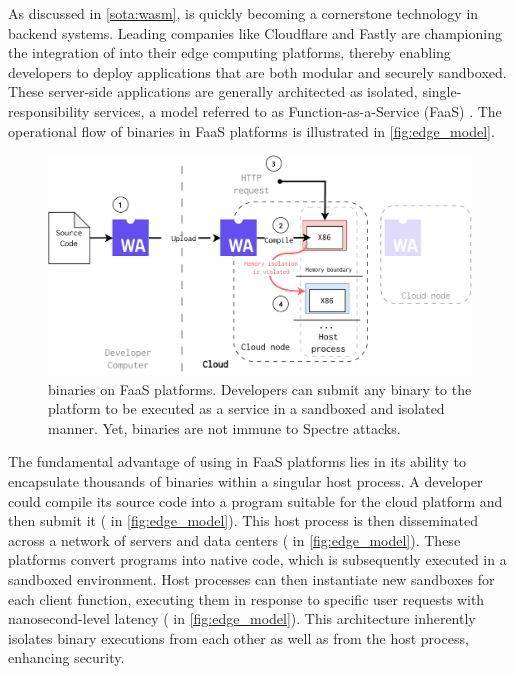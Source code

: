 

\label{exploit:defensive}

As discussed in \autoref{sota:wasm}, \Wasm is quickly becoming a cornerstone technology in backend systems. 
Leading companies like Cloudflare and Fastly are championing the integration of \Wasm into their edge computing platforms, thereby enabling developers to deploy applications that are both modular and securely sandboxed. 
These server-side \Wasm applications are generally architected as isolated, single-responsibility services, a model referred to as Function-as-a-Service (FaaS) \cite{pMendkiServerless, 1244493Jacobsson}. 
The operational flow of \Wasm binaries in FaaS platforms is illustrated in \autoref{fig:edge_model}.

\begin{figure}[h]
    \centering
    \includegraphics[width=0.8\linewidth]{figures/edge.pdf}
    \caption{\Wasm binaries on FaaS platforms. Developers can submit any \Wasm binary to the platform to be executed as a service in a sandboxed and isolated manner. Yet, \Wasm binaries are not immune to Spectre attacks.}
    \label{fig:edge_model}
\end{figure}


The fundamental advantage of using \Wasm in FaaS platforms lies in its ability to encapsulate thousands of \Wasm binaries within a singular host process.
A developer could compile its source code into a \Wasm program suitable for the cloud platform and then submit it ( in \autoref{fig:edge_model}).
This host process is then disseminated across a network of servers and data centers ( in \autoref{fig:edge_model}). 
These platforms convert \Wasm programs into native code, which is subsequently executed in a sandboxed environment. 
Host processes can then instantiate new \Wasm sandboxes for each client function, executing them in response to specific user requests with nanosecond-level latency ( in \autoref{fig:edge_model}). 
This architecture inherently isolates \Wasm binary executions from each other as well as from the host process, enhancing security.

